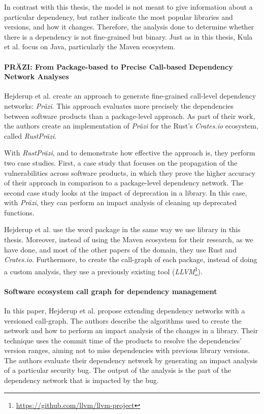 In contrast with this thesis, the model is not meant to give information about a particular dependency, but rather indicate the most popular libraries and versions, and how it changes. Therefore, the analysis done to determine whether there is a dependency is not fine-grained but binary. Just as in this thesis, Kula et al. focus on Java, particularly the Maven ecosystem.

\paragraph{PRÄZI: From Package-based to Precise Call-based Dependency Network Analyses \cite{hejderup2018prazi}}
Hejderup et al. create an approach to generate fine-grained call-level dependency networks: \textit{Präzi}. This approach evaluates more precisely the dependencies between software products than a package-level approach. As part of their work, the authors create an implementation of \textit{Präzi} for the Rust's \textit{Crates.io} ecosystem, called \textit{RustPräzi}.

With \textit{RustPräzi}, and to demonstrate how effective the approach is, they perform two case studies. First, a case study that focuses on the propagation of the vulnerabilities across software products, in which they prove the higher accuracy of their approach in comparison to a package-level dependency network. The second case study looks at the impact of deprecation in a library. In this case, with \textit{Präzi}, they can perform an impact analysis of cleaning up deprecated functions.

Hejderup et al. use the word package in the same way we use library in this thesis. Moreover, instead of using the Maven ecosystem for their research, as we have done, and most of the other papers of the domain, they use Rust and \textit{Crates.io}. Furthermore, to create the call-graph of each package, instead of doing a custom analysis, they use a previously existing tool (\textit{LLVM}\footnote{\href{https://github.com/llvm/llvm-project}{https://github.com/llvm/llvm-project}}).

\paragraph{Software ecosystem call graph for dependency management \cite{hejderup2018software}}
In this paper, Hejderup et al. propose extending dependency networks with a versioned call-graph. The authors describe the algorithms used to create the network and how to perform an impact analysis of the changes in a library. Their technique uses the commit time of the products to resolve the dependencies' version ranges, aiming not to miss dependencies with previous library versions. The authors evaluate their dependency network by generating an impact analysis of a particular security bug. The output of the analysis is the part of the dependency network that is impacted by the bug.


